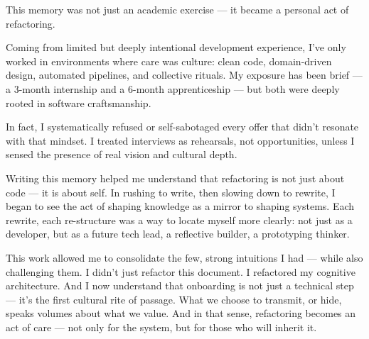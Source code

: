 This memory was not just an academic exercise — it became a personal act of refactoring.

Coming from limited but deeply intentional development experience, I’ve only worked in environments where care was culture: clean code, domain-driven design, automated pipelines, and collective rituals. My exposure has been brief — a 3-month internship and a 6-month apprenticeship — but both were deeply rooted in software craftsmanship.

In fact, I systematically refused or self-sabotaged every offer that didn't resonate with that mindset. I treated interviews as rehearsals, not opportunities, unless I sensed the presence of real vision and cultural depth.

Writing this memory helped me understand that refactoring is not just about code — it is about self. In rushing to write, then slowing down to rewrite, I began to see the act of shaping knowledge as a mirror to shaping systems. Each rewrite, each re-structure was a way to locate myself more clearly: not just as a developer, but as a future tech lead, a reflective builder, a prototyping thinker.

This work allowed me to consolidate the few, strong intuitions I had — while also challenging them. I didn’t just refactor this document. I refactored my cognitive architecture. And I now understand that onboarding is not just a technical step — it’s the first cultural rite of passage. What we choose to transmit, or hide, speaks volumes about what we value. And in that sense, refactoring becomes an act of care — not only for the system, but for those who will inherit it.
